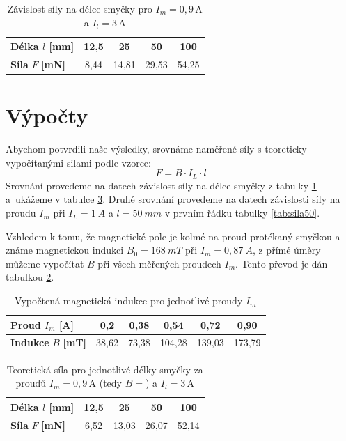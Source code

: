 \documentclass[a4paper,12pt]{article}
\begin{document}
\begin{table}[H]
    \centering
    \renewcommand{\arraystretch}{1.4}
    \begin{tabular}{|l|c|c|c|c|}
        \hline
        \textbf{Délka} $l$ \textbf{[mm]} & 12,5 & 25 & 50 & 100 \\ \hline
        \textbf{Síla} $F$ \textbf{[mN]} & 8,44 & 14,81 & 29,53 & 54,25 \\ \hline
    \end{tabular}
    \caption{Závislost síly na délce smyčky pro $I_m = 0{,}9\,\mathrm{A}$ a $I_l = 3\,\mathrm{A}$}
    \label{tab:sila_vs_delka_horizontal}
\end{table}

\section{Výpočty}
Abychom potvrdili naše výsledky, srovnáme naměřené síly s teoreticky vypočítanými silami podle vzorce:
$$
F = B \cdot I_L \cdot l
$$
Srovnání provedeme na datech závislost síly na délce smyčky z tabulky \ref{tab:sila_vs_delka_horizontal} a~ukážeme v tabulce \ref{tab:sila_vs_delka_theory}. Druhé srovnání provedeme na datech závislosti síly na proudu $I_m$ při $I_L = 1\ A$ a $l=50\ mm$ v prvním řádku tabulky \ref{tab:sila50}.

Vzhledem k tomu, že magnetické pole je kolmé na proud protékaný smyčkou a známe magnetickou indukci $B_0 = 168\ mT$ při $I_m = 0,87\ A$, z přímé úměry můžeme vypočítat $B$ při všech měřených proudech $I_m$. Tento převod je dán tabulkou \ref{tab:convert}. 

\begin{table}[H]
    \centering
    \renewcommand{\arraystretch}{1.4}
    \begin{tabular}{|l|c|c|c|c|c|}
        \hline
        \textbf{Proud} $I_m$ \textbf{[A]} & 0,2 & 0,38 & 0,54 & 0,72 & 0,90 \\ \hline
        \textbf{Indukce} $B$ \textbf{[mT]} & 38,62 & 73,38 & 104,28 & 139,03 & 173,79 \\ \hline
    \end{tabular}
    \caption{Vypočtená magnetická indukce pro jednotlivé proudy $I_m$}
    \label{tab:convert}
\end{table}

\begin{table}[H]
    \centering
    \renewcommand{\arraystretch}{1.4}
    \begin{tabular}{|l|c|c|c|c|}
        \hline
        \textbf{Délka} $l$ \textbf{[mm]} & 12,5 & 25 & 50 & 100 \\ \hline
        \textbf{Síla} $F$ \textbf{[mN]} & 6,52 & 13,03 & 26,07 & 52,14 \\ \hline
    \end{tabular}
    \caption{Teoretická síla pro jednotlivé délky smyčky za proudů $I_m = 0{,}9\,\mathrm{A}$ (tedy $B=$) a $I_l = 3\,\mathrm{A}$}
    \label{tab:sila_vs_delka_theory}
\end{table}
\end{document}
